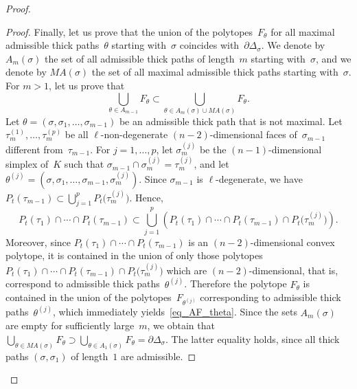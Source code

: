 \documentclass[reqno,tbtags,12pt]{amsart}
\numberwithin{equation}{section}
\newcommand{\bell}{\boldsymbol{\ell}}
\theoremstyle{definition}
\begin{document}
\begin{proof}
\begin{proof}
Finally, let us prove that the union of the polytopes~$F_{\theta}$ for all maximal admissible thick paths~$\theta$ starting with~$\sigma$ coincides with~$\partial  \Delta_{\sigma}$. We denote by  $A_m(\sigma)$ the set of all admissible thick paths of length~$m$ starting with~$\sigma$, and we denote by $MA(\sigma)$ the set of all maximal admissible thick paths starting with~$\sigma$.  For $m>1$, let us prove  that 
\begin{equation}\label{eq_AF_theta}
\bigcup_{\theta\in A_{m-1}}F_{\theta}\subset \bigcup_{\theta\in A_m(\sigma)\cup MA(\sigma)}F_{\theta}.
\end{equation}
Let $\theta=(\sigma,\sigma_1,\ldots,\sigma_{m-1})$ be an admissible thick path that is not maximal.  Let $\tau_m^{(1)},\ldots,\tau_m^{(p)}$ be all $\bell$-non-degenerate $(n-2)$-dimensional faces of~$\sigma_{m-1}$ different from~$\tau_{m-1}$. For $j=1,\ldots,p$, let $\sigma_m^{(j)}$ be the $(n-1)$-dimensional simplex of~$K$ such that $\sigma_{m-1}\cap\sigma_m^{(j)}=\tau_m^{(j)}$, and let
$\theta^{(j)}=(\sigma,\sigma_1,\ldots,\sigma_{m-1},\sigma_m^{(j)})$. Since $\sigma_{m-1}$ is $\bell$-degenerate, we have $P_t(\tau_{m-1})\subset \bigcup_{j=1}^pP_t\bigl(\tau_m^{(j)}\bigr)$. Hence,
\begin{equation*}
P_t(\tau_1)\cap\cdots\cap P_t(\tau_{m-1})\subset \bigcup_{j=1}^p\left(P_t(\tau_1)\cap\cdots\cap P_t(\tau_{m-1})\cap P_t\bigl(\tau_m^{(j)}\bigr)\right).
\end{equation*}
Moreover, since $P_t(\tau_1)\cap\cdots\cap P_t(\tau_{m-1})$ is an $(n-2)$-dimensional convex polytope, it is contained in the union of only those polytopes $P_t(\tau_1)\cap\cdots\cap P_t(\tau_{m-1})\cap P_t\bigl(\tau_m^{(j)}\bigr)$ which are $(n-2)$-dimensional, that is, correspond to admissible thick paths~$\theta^{(j)}$. Therefore the polytope $F_{\theta}$ is contained in the union of the polytopes~$F_{\theta^{(j)}}$ corresponding to admissible thick paths~$\theta^{(j)}$, which immediately yields~\eqref{eq_AF_theta}. Since the sets $A_m(\sigma)$ are empty for sufficiently large~$m$, we obtain that $\bigcup_{\theta\in MA(\sigma)}F_{\theta}\supset\bigcup_{\theta\in A_1(\sigma)}F_{\theta}=\partial  \Delta_{\sigma}$. The latter equality holds, since all thick paths $(\sigma,\sigma_1)$ of length~$1$ are admissible.
\end{proof}


\end{proof}
\end{document}
